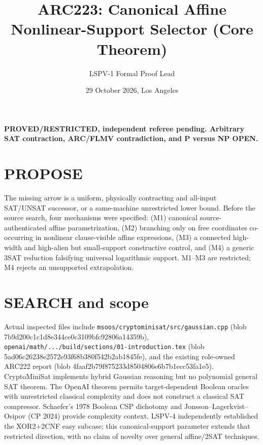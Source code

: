 \documentclass[11pt]{article}
\title{ARC223: Canonical Affine Nonlinear-Support Selector (Core Theorem)}
\author{LSPV-1 Formal Proof Lead}
\date{29 October 2026, Los Angeles}
\begin{document}
\maketitle
\begin{center}\textbf{PROVED/RESTRICTED, independent referee pending.
Arbitrary SAT contraction, ARC/FLMV contradiction, and P versus NP OPEN.}\end{center}
\section{PROPOSE}
The missing arrow is a uniform, physically contracting and all-input SAT/UNSAT successor, or a same-machine unrestricted lower bound. Before the source search, four mechanisms were specified: (M1) canonical source-authenticated affine parametrization, (M2) branching only on free coordinates co-occurring in nonlinear clause-visible affine expressions, (M3) a connected high-width and high-alien but small-support constructive control, and (M4) a generic 3SAT reduction falsifying universal logarithmic support. M1--M3 are restricted; M4 rejects an unsupported extrapolation.
\section{SEARCH and scope}
Actual inspected files include \texttt{msoos/cryptominisat/src/gaussian.cpp} (blob 7b9d200c1c1d8e344ce0c3109bfc92806a14359b), \texttt{openai/math/.../build/sections/01-introduction.tex} (blob 5ad06c26238e2572e93f68b380f542b2ab1845fe), and the existing role-owned ARC222 report (blob 4faaf2b79f875233d8504806e6b7b1ecc53fa1e5). CryptoMiniSat implements hybrid Gaussian reasoning but no polynomial general SAT theorem. The OpenAI theorem permits target-dependent Boolean oracles with unrestricted classical complexity and does not construct a classical SAT compressor. Schaefer's 1978 Boolean CSP dichotomy and Jonsson--Lagerkvist--Osipov (CP 2024) provide complexity context. LSPV-4 independently established the XOR2+2CNF easy subcase; this canonical-support parameter extends that restricted direction, with no claim of novelty over general affine/2SAT techniques.
\end{document}
